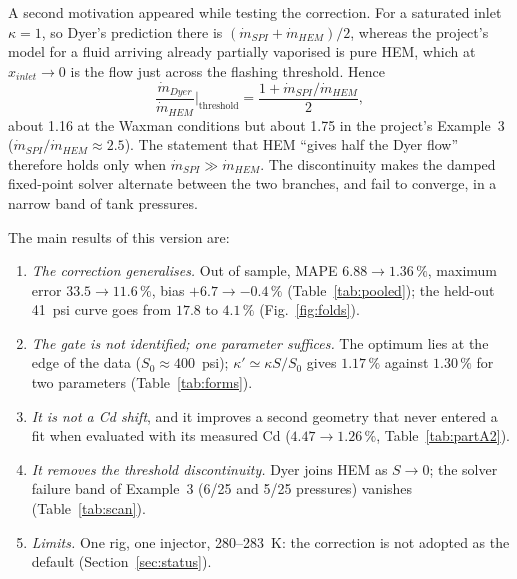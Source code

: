 \documentclass[11pt,a4paper]{article}
\newcommand{\mdot}{\dot m}
\begin{document}
A second motivation appeared while testing the correction. For a saturated inlet $\kappa=1$, so Dyer's prediction there is $(\mdot_{SPI}+\mdot_{HEM})/2$, whereas the project's model for a fluid arriving already partially vaporised is pure HEM, which at $x_{inlet}\to0$ is the flow just across the flashing threshold. Hence
\begin{equation}
\frac{\mdot_{Dyer}}{\mdot_{HEM}}\Big|_{\text{threshold}}=\frac{1+\mdot_{SPI}/\mdot_{HEM}}{2},
\label{eq:jump}
\end{equation}
about 1.16 at the Waxman conditions but about 1.75 in the project's Example~3 ($\mdot_{SPI}/\mdot_{HEM}\approx2.5$). The statement that HEM ``gives half the Dyer flow'' therefore holds only when $\mdot_{SPI}\gg\mdot_{HEM}$. The discontinuity makes the damped fixed-point solver alternate between the two branches, and fail to converge, in a narrow band of tank pressures.

The main results of this version are:
\begin{enumerate}[label=(\roman*)]
\item \emph{The correction generalises.} Out of sample, MAPE $6.88\to1.36\,\%$, maximum error $33.5\to11.6\,\%$, bias $+6.7\to-0.4\,\%$ (Table~\ref{tab:pooled}); the held-out 41~psi curve goes from $17.8$ to $4.1\,\%$ (Fig.~\ref{fig:folds}).
\item \emph{The gate is not identified; one parameter suffices.} The optimum lies at the edge of the data ($S_0\approx400$~psi); $\kappa'\simeq\kappa S/S_0$ gives $1.17\,\%$ against $1.30\,\%$ for two parameters (Table~\ref{tab:forms}).
\item \emph{It is not a Cd shift}, and it improves a second geometry that never entered a fit when evaluated with its measured Cd ($4.47\to1.26\,\%$, Table~\ref{tab:partA2}).
\item \emph{It removes the threshold discontinuity.} Dyer joins HEM as $S\to0$; the solver failure band of Example~3 (6/25 and 5/25 pressures) vanishes (Table~\ref{tab:scan}).
\item \emph{Limits.} One rig, one injector, 280--283~K: the correction is not adopted as the default (Section~\ref{sec:status}).
\end{enumerate}

\end{document}
